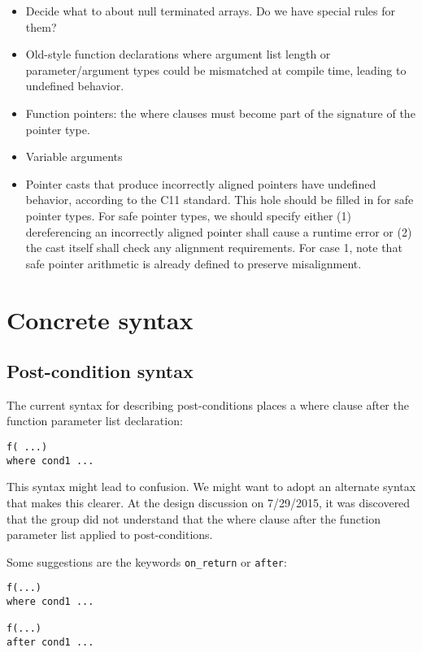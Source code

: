 \begin{itemize}
\item
  Decide what to about null terminated arrays. Do we have special rules
  for them?
\item
  Old-style function declarations where argument list length or
  parameter/argument types could be mismatched at compile time, leading
  to undefined behavior.
\item
  Function pointers: the where clauses must become part of the signature
  of the pointer type.
\item
  Variable arguments
\item
  Pointer casts that produce incorrectly aligned pointers have undefined
  behavior, according to the C11 standard. This hole should be filled in
  for safe pointer types. For safe pointer types, we should specify
  either (1) dereferencing an incorrectly aligned pointer shall cause a
  runtime error or (2) the cast itself shall check any alignment
  requirements. For case 1, note that safe pointer arithmetic is already
  defined to preserve misalignment.
\end{itemize}

\section{Concrete syntax}

\subsection{Post-condition syntax}
The current syntax for describing post-conditions places a where clause
after the function parameter list declaration:

\begin{verbatim}
f( ...)
where cond1 ...
\end{verbatim}

This syntax might lead to confusion. We might want to adopt an alternate
syntax that makes this clearer. At the design discussion on 7/29/2015,
it was discovered that the group did not understand that the where
clause after the function parameter list applied to post-conditions.

Some suggestions are the keywords \texttt{on\_return} or \texttt{after}:

\begin{verbatim}
f(...)
where cond1 ...

f(...)
after cond1 ...
\end{verbatim}

